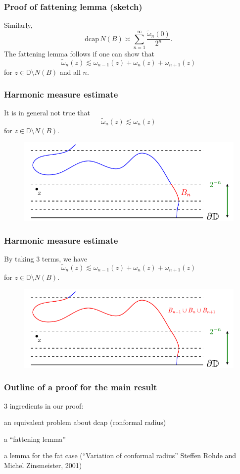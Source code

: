 \documentclass[xcolor=pdftex,dvipsnames,table]{beamer}
\newcommand{\bbD}{\mathbb{D}}
\newcommand{\go}{\omega}
\newcommand{\dcap}{\text{dcap}}
\theoremstyle{definition}
\begin{document}
\begin{frame}
  \frametitle{Proof of fattening lemma (sketch)}
  Similarly,
   \[
       \dcap \, N(B) \asymp \sum_{n=1}^{\infty} \frac{\widetilde{\go}_n(0)}{2^n}.
  \]
  The fattening lemma follows if one can show that
  \[
      \widetilde{\go}_n(z) \lesssim \go_{n-1}(z) + \go_n(z) + \go_{n+1}(z)
  \]
  for $z \in \bbD \setminus N(B)$ and all $n$.
\end{frame}

\begin{frame}
  \frametitle{Harmonic measure estimate}
  It is in general not true that
  \[
      \widetilde{\go}_n(z) \lesssim \go_n(z)
  \]
  for $z \in \bbD \setminus N(B)$.
  \begin{figure}
      \includegraphics[scale=0.8]{figures/harmEst.pdf}
  \end{figure}
\end{frame}

\begin{frame}
  \frametitle{Harmonic measure estimate}
  By taking 3 terms, we have
  \[
       \widetilde{\go}_n(z) \lesssim \go_{n-1}(z) + \go_n(z) + \go_{n+1}(z)
  \]
  for $z \in \bbD \setminus N(B)$.
  \begin{figure}
      \includegraphics[scale=0.8]{figures/harmEst_01.pdf}
  \end{figure}
\end{frame}
 
\begin{frame}
  \frametitle{Outline of a proof for the main result}
  3 ingredients in our proof: \vspace{.2in}
  \begin{enumerate} \setlength{\itemsep}{.2in}
    \item  {\color{black!30} an equivalent problem about dcap (conformal radius)
    \item  a ``fattening lemma''}
    \item  a lemma for the fat case (``Variation of conformal radius''
              Steffen Rohde and Michel Zinsmeister, 2001)
  \end{enumerate}
\end{frame}
\end{document}
